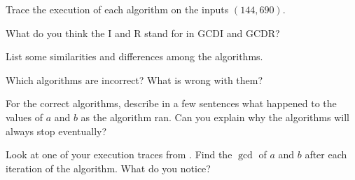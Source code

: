 \documentclass{tufte-handout}
\begin{document}
\begin{questions}
\item \label{q:trace} Trace the execution of each algorithm on the inputs
  $(144,690)$.
\end{questions}

\newpage
\begin{questions}
\item What do you think the \textsf{I} and \textsf{R} stand for in
  \textsf{GCDI} and \textsf{GCDR}?
\item List some similarities and differences among the algorithms.
\item Which algorithms are incorrect?  What is wrong with them?
\item For the correct algorithms, describe in a few sentences what
  happened to the values of $a$ and $b$ as the algorithm ran.  Can you
  explain why the algorithms will always stop eventually?
\item Look at one of your execution traces from .  Find
  the $\gcd$ of $a$ and $b$ after each iteration of the algorithm.
  What do you notice?
\end{questions}
\end{document}
